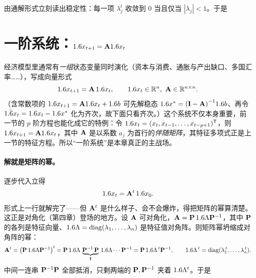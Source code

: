 由通解形式立刻读出稳定性：每一项 $\lambda_j^t$ 收敛到 $0$ 当且仅当 $|\lambda_j|<1$。于是




\section{一阶系统：$1.6 x_{t+1}=\mathbf{A}1.6 x_t$}
\label{sec:difference-4}

经济模型里通常有\emph{一组}状态变量同时演化（资本与消费、通胀与产出缺口、多国汇率……），写成向量形式
\[
    1.6 x_{t+1}=\mathbf{A}\,1.6 x_t,\qquad 1.6 x_t\in\mathbb{R}^n,\ \mathbf{A}\in\mathbb{R}^{n\times n}.
\]
（含常数项的 $1.6 x_{t+1}=\mathbf{A}1.6 x_t+1.6 b$ 可先解稳态 $1.6 x^\ast={(\mathbf{I}-\mathbf{A})}^{-1}1.6 b$、再令 $\hat{1.6 x}_t=1.6 x_t-1.6 x^\ast$ 化为齐次，故下面只看齐次。）这个系统不仅本身重要，前一节的 $p$ 阶方程也能化成它的特例：令 $1.6 x_t=(x_t,x_{t-1},\dots,x_{t-p+1})^{\mathsf{T}}$，则 $1.6 x_{t+1}=\mathbf{A}1.6 x_t$，其中 $\mathbf{A}$ 是以系数 $a_j$ 为首行的\emph{伴随矩阵}，其特征多项式正是上一节的特征方程。所以``一阶系统''是本章真正的主战场。

\paragraph{解就是矩阵的幂。}逐步代入立得
\[
    1.6 x_t=\mathbf{A}^t\,1.6 x_0 .
\]
形式上一行就解完了——但 $\mathbf{A}^t$ 是什么样子、会不会爆炸，得把矩阵的幂算清楚。这正是对角化（第四章）登场的地方。设 $\mathbf{A}$ 可对角化，$\mathbf{A}=\mathbf{P}\,1.6\Lambda{\mathbf{P}}^{-1}$，其中 $\mathbf{P}$ 的各列是特征向量、$1.6\Lambda=\operatorname{diag}(\lambda_1,\dots,\lambda_n)$ 是特征值对角阵。则矩阵幂坍缩成对角阵的幂：
\[
    \mathbf{A}^t=\left(\mathbf{P}\,1.6\Lambda{\mathbf{P}}^{-1}\right)^t
    =\mathbf{P}\,1.6\Lambda\,\underbrace{{\mathbf{P}}^{-1}\,\mathbf{P}}_{\mathbf{I}}\,1.6\Lambda\cdots{\mathbf{P}}^{-1}
    =\mathbf{P}\,1.6\Lambda^{\,t}{\mathbf{P}}^{-1},
    \qquad
    1.6\Lambda^{\,t}=\operatorname{diag}(\lambda_1^{\,t},\dots,\lambda_n^{\,t}).
\]
中间一连串 ${\mathbf{P}}^{-1}\mathbf{P}$ 全部抵消，只剩两端的 $\mathbf{P},{\mathbf{P}}^{-1}$ 夹着 $1.6\Lambda^t$。于是

